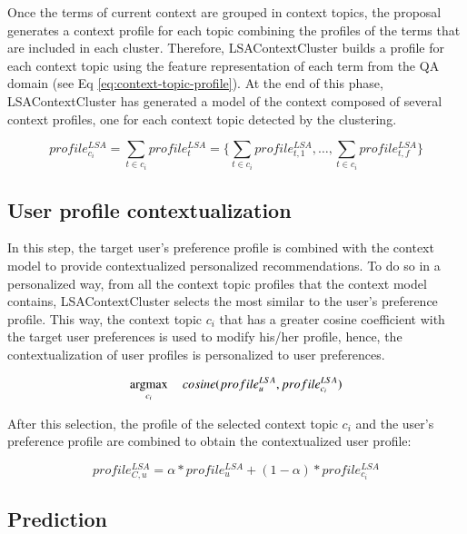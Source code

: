 \documentclass[preprint]{elsarticle}
\newcommand{\argmax}{\operatornamewithlimits{argmax}}
\begin{document}
\begin{spacing}{1.5}
Once the terms of current context are grouped in context topics, the proposal generates a context profile for each topic combining the profiles of the terms that are included in each cluster. Therefore, LSAContextCluster builds a profile for each context topic using the feature representation of each term from the QA domain (see Eq \ref{eq:context-topic-profile}). At the end of this phase, LSAContextCluster has generated a model of the context composed of several context profiles, one for each context topic detected by the clustering.

\begin{equation}
	profile^{LSA}_{c_i} = \sum_{t \in c_i} profile^{LSA}_{t}=\{\sum_{t \in c_i} profile^{LSA}_{t,1}, \dots, \sum_{t \in c_i} profile^{LSA}_{t,f} \}
	\label{eq:context-topic-profile}
\end{equation}


\subsection{User profile contextualization}

In this step, the target user's preference profile is combined with the context model to provide contextualized personalized recommendations. To do so in a personalized way, from all the context topic profiles that the context model contains, LSAContextCluster selects the most similar to the user's preference profile. This way, the context topic $c_i$ that has a greater cosine coefficient with the target user preferences is used to modify his/her profile, hence, the contextualization of user profiles is personalized to user preferences.

\begin{equation}
	\argmax_{c_i}~~~~ cosine(profile^{LSA}_u,profile^{LSA}_{c_i})
\end{equation}

After this selection, the profile of the selected context topic $c_i$ and the user's preference profile are combined to obtain the contextualized user profile:

\begin{equation}
	profile^{LSA}_{C,u} = \alpha * profile^{LSA}_u + (1- \alpha )*profile^{LSA}_{c_i}
\end{equation}

\subsection{Prediction}


\end{spacing}
\end{document}
